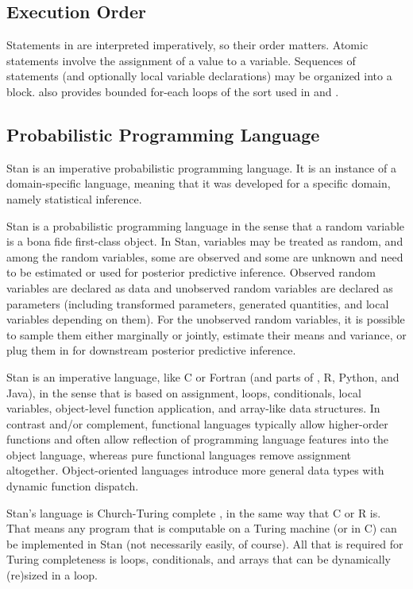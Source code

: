 \subsection{Execution Order}

Statements in \Stan are interpreted imperatively, so their order
matters.  Atomic statements involve the assignment of a value to a
variable.  Sequences of statements (and optionally local variable
declarations) may be organized into a block.  \Stan also provides bounded
for-each loops of the sort used in \R and \BUGS.



\subsection{Probabilistic Programming Language}

Stan is an imperative probabilistic programming language.  It is an
instance of a domain-specific language, meaning that it was
developed for a specific domain, namely statistical inference.

Stan is a probabilistic programming language in the sense that a
random variable is a bona fide first-class object.  In Stan, variables
may be treated as random, and among the random variables, some are
observed and some are unknown and need to be estimated or used for
posterior predictive inference.  Observed random variables are
declared as data and unobserved random variables are declared as
parameters (including transformed parameters, generated quantities, and
local variables depending on them).  For the unobserved random
variables, it is possible to sample them either marginally or jointly,
estimate their means and variance, or plug them in for downstream
posterior predictive inference.

Stan is an imperative language, like C or Fortran (and parts of \Cpp,
R, Python, and Java), in the sense that is based on assignment, loops,
conditionals, local variables, object-level function application, and
array-like data structures.  In contrast and/or complement, functional
languages typically allow higher-order functions and often allow
reflection of programming language features into the object language,
whereas pure functional languages remove assignment altogether.
Object-oriented languages introduce more general data types with
dynamic function dispatch.

Stan's language is Church-Turing complete
\cite{Church:1936,Turing:1936,HopcroftMotwani:2006}, in the same way
that C or R is.  That means any program that is computable on a Turing
machine (or in C) can be implemented in Stan (not necessarily easily,
of course).  All that is required for Turing completeness is loops,
conditionals, and arrays that can be dynamically (re)sized in a loop.

